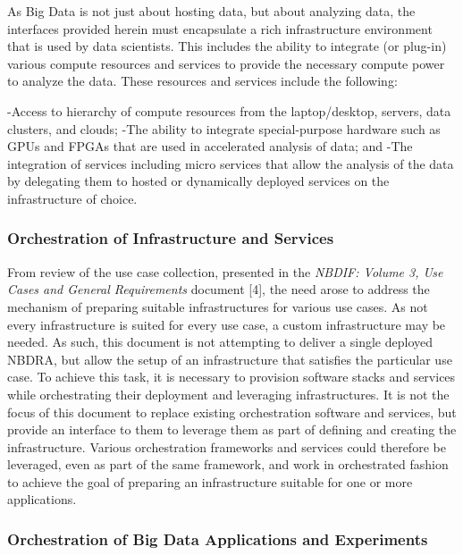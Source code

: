 \documentclass[9pt,]{article}
\begin{document}
As Big Data is not just about hosting data, but about analyzing data,
the interfaces provided herein must encapsulate a rich infrastructure
environment that is used by data scientists. This includes the ability
to integrate (or plug-in) various compute resources and services to
provide the necessary compute power to analyze the data. These resources
and services include the following:

-Access to hierarchy of compute resources from the laptop/desktop,
servers, data clusters, and clouds; -The ability to integrate
special-purpose hardware such as GPUs and FPGAs that are used in
accelerated analysis of data; and -The integration of services including
micro services that allow the analysis of the data by delegating them to
hosted or dynamically deployed services on the infrastructure of choice.

\hypertarget{orchestration-of-infrastructure-and-services}{%
\subsubsection{Orchestration of Infrastructure and
Services}\label{orchestration-of-infrastructure-and-services}}

From review of the use case collection, presented in the \emph{NBDIF:
Volume 3, Use Cases and General Requirements} document {[}4{]}, the need
arose to address the mechanism of preparing suitable infrastructures for
various use cases. As not every infrastructure is suited for every use
case, a custom infrastructure may be needed. As such, this document is
not attempting to deliver a single deployed NBDRA, but allow the setup
of an infrastructure that satisfies the particular use case. To achieve
this task, it is necessary to provision software stacks and services
while orchestrating their deployment and leveraging infrastructures. It
is not the focus of this document to replace existing orchestration
software and services, but provide an interface to them to leverage them
as part of defining and creating the infrastructure. Various
orchestration frameworks and services could therefore be leveraged, even
as part of the same framework, and work in orchestrated fashion to
achieve the goal of preparing an infrastructure suitable for one or more
applications.

\hypertarget{orchestration-of-big-data-applications-and-experiments}{%
\subsubsection{Orchestration of Big Data Applications and
Experiments}\label{orchestration-of-big-data-applications-and-experiments}}
\end{document}
